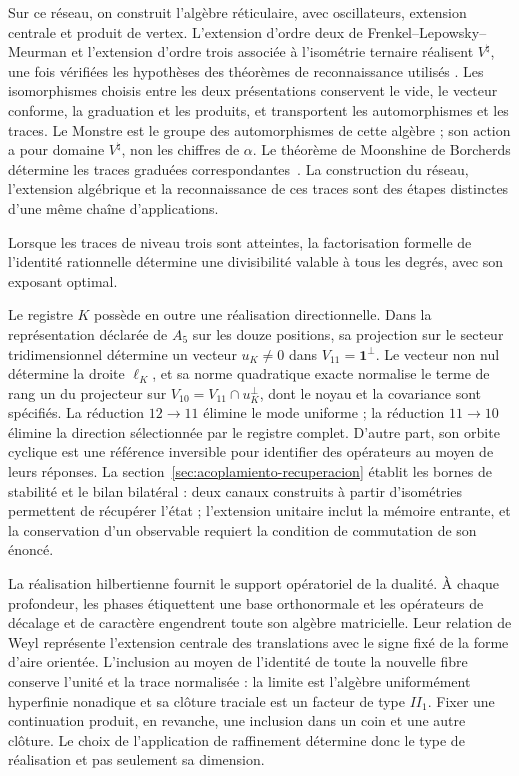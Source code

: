 Sur ce réseau, on construit l’algèbre réticulaire, avec oscillateurs,
extension centrale et produit de vertex. L’extension d’ordre deux de
Frenkel--Lepowsky--Meurman et l’extension d’ordre trois associée à
l’isométrie ternaire réalisent \(V^\natural\), une fois vérifiées les
hypothèses des théorèmes de reconnaissance utilisés
\cite{flm,chenlamshimakura2016,abelamyamada2017}.
Les isomorphismes choisis entre les deux présentations conservent le vide,
le vecteur conforme, la graduation et les produits, et transportent les automorphismes
et les traces. Le Monstre est le groupe des automorphismes de cette algèbre ;
son action a pour domaine \(V^\natural\), non les chiffres de
\(\alpha\). Le théorème de Moonshine de Borcherds détermine les traces
graduées correspondantes~\cite{borcherds}. La construction du
réseau, l’extension algébrique et la reconnaissance de ces traces
sont des étapes distinctes d’une même chaîne d’applications.

Lorsque les traces de niveau trois sont atteintes, la factorisation formelle
de l’identité rationnelle détermine une divisibilité valable à tous
les degrés, avec son exposant optimal.

Le registre \(K\) possède en outre une réalisation directionnelle.
Dans la représentation déclarée de \(A_5\) sur les douze positions,
sa projection sur le secteur tridimensionnel détermine un vecteur
\(u_K\ne0\) dans \(V_{11}=\mathbf1^\perp\).
Le vecteur non nul détermine la droite \(\ell_K\), et sa norme quadratique
exacte normalise le terme de rang un du projecteur sur
\(V_{10}=V_{11}\cap u_K^\perp\), dont le noyau et la covariance sont
spécifiés. La réduction \(12\to11\) élimine le mode uniforme ;
la réduction \(11\to10\) élimine la direction sélectionnée par le
registre complet. D’autre part, son orbite cyclique est une référence
inversible pour identifier des opérateurs au moyen de leurs réponses.
La section~\ref{sec:acoplamiento-recuperacion} établit les bornes
de stabilité et le bilan bilatéral : deux canaux construits à partir d’isométries permettent
de récupérer l’état ; l’extension unitaire inclut la mémoire entrante,
et la conservation d’un observable requiert la condition de commutation
de son énoncé.

La réalisation hilbertienne fournit le support opératoriel de la
dualité. À chaque profondeur, les phases étiquettent une base orthonormale
et les opérateurs de décalage et de caractère engendrent toute son algèbre
matricielle. Leur relation de Weyl représente l’extension centrale des
translations avec le signe fixé de la forme d’aire orientée.
L’inclusion au moyen de l’identité de toute la nouvelle fibre conserve
l’unité et la trace normalisée : la limite est l’algèbre uniformément
hyperfinie nonadique et sa clôture traciale est un facteur de type \(II_1\).
Fixer une continuation produit, en revanche, une inclusion dans un coin
et une autre clôture. Le choix de l’application de raffinement détermine donc
le type de réalisation et pas seulement sa dimension.

